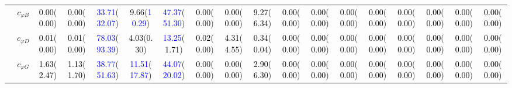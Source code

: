 \documentclass{article}
\begin{document}
\begin{landscape}
\begin{table}[H]
\begin{tabular}{|c|c|c|c|c|c|c|c|c|c|c|c|c|c|c|c|c|c|}
 & $c_{\varphi B}$ & \textcolor{black}{0.00}(\textcolor{black}{0.00}) & \textcolor{black}{0.00}(\textcolor{black}{0.00}) & \textcolor{blue}{33.71}(\textcolor{blue}{32.07}) & \textcolor{black}{9.66}(\textcolor{blue}{10.29}) & \textcolor{blue}{47.37}(\textcolor{blue}{51.30}) & \textcolor{black}{0.00}(\textcolor{black}{0.00}) & \textcolor{black}{0.00}(\textcolor{black}{0.00}) & \textcolor{black}{9.27}(\textcolor{black}{6.34}) & \textcolor{black}{0.00}(\textcolor{black}{0.00}) & \textcolor{black}{0.00}(\textcolor{black}{0.00}) & \textcolor{black}{0.00}(\textcolor{black}{0.00}) & \textcolor{black}{0.00}(\textcolor{black}{0.00}) & \textcolor{black}{0.00}(\textcolor{black}{0.00}) & \textcolor{black}{0.00}(\textcolor{black}{0.00}) & \textcolor{black}{0.00}(\textcolor{black}{0.00}) & \textcolor{black}{0.00}(\textcolor{black}{0.00})\\ \cline{2-18}
 & $c_{\varphi D}$ & \textcolor{black}{0.01}(\textcolor{black}{0.00}) & \textcolor{black}{0.01}(\textcolor{black}{0.00}) & \textcolor{blue}{78.03}(\textcolor{blue}{93.39}) & \textcolor{black}{4.03}(\textcolor{black}{0.30}) & \textcolor{blue}{13.25}(\textcolor{black}{1.71}) & \textcolor{black}{0.02}(\textcolor{black}{0.00}) & \textcolor{black}{4.31}(\textcolor{black}{4.55}) & \textcolor{black}{0.34}(\textcolor{black}{0.04}) & \textcolor{black}{0.00}(\textcolor{black}{0.00}) & \textcolor{black}{0.00}(\textcolor{black}{0.00}) & \textcolor{black}{0.00}(\textcolor{black}{0.00}) & \textcolor{black}{0.00}(\textcolor{black}{0.00}) & \textcolor{black}{0.00}(\textcolor{black}{0.00}) & \textcolor{black}{0.00}(\textcolor{black}{0.00}) & \textcolor{black}{0.00}(\textcolor{black}{0.00}) & \textcolor{black}{0.00}(\textcolor{black}{0.00})\\ \cline{2-18}
 & $c_{\varphi G}$ & \textcolor{black}{1.63}(\textcolor{black}{2.47}) & \textcolor{black}{1.13}(\textcolor{black}{1.70}) & \textcolor{blue}{38.77}(\textcolor{blue}{51.63}) & \textcolor{blue}{11.51}(\textcolor{blue}{17.87}) & \textcolor{blue}{44.07}(\textcolor{blue}{20.02}) & \textcolor{black}{0.00}(\textcolor{black}{0.00}) & \textcolor{black}{0.00}(\textcolor{black}{0.00}) & \textcolor{black}{2.90}(\textcolor{black}{6.30}) & \textcolor{black}{0.00}(\textcolor{black}{0.00}) & \textcolor{black}{0.00}(\textcolor{black}{0.00}) & \textcolor{black}{0.00}(\textcolor{black}{0.00}) & \textcolor{black}{0.00}(\textcolor{black}{0.00}) & \textcolor{black}{0.00}(\textcolor{black}{0.00}) & \textcolor{black}{0.00}(\textcolor{black}{0.00}) & \textcolor{black}{0.00}(\textcolor{black}{0.00}) & \textcolor{black}{0.00}(\textcolor{black}{0.00})\\ \cline{2-18}

\end{tabular}
\end{table}
\end{landscape}
\end{document}
